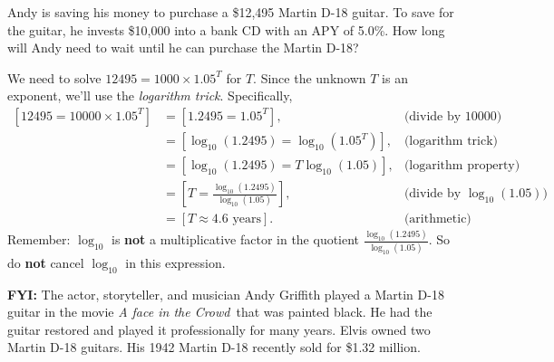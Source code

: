 \documentclass[12pt,fleqn,answers]{exam}
\begin{document}
\begin{questions} 

\question [2] Andy is saving his money to purchase a \$12,495 Martin D-18 guitar.
To save for the guitar, he invests \$10,000 into a bank CD with an APY of 5.0\%. 
How long will Andy need to wait until he can purchase the Martin D-18?

\begin{solution}[3.0in]
    We need to solve $12495 = 1000 \times 1.05^T$ for $T$. Since the unknown
    $T$ is an exponent, we'll use the \emph{logarithm trick}. Specifically,
    \begin{align*}
      \left[12495 = 10000 \times 1.05^T \right] &= \left[1.2495 = 1.05^T \right], &\mbox{(divide by 10000)} \\
                     &= \left[\log_{10}(1.2495) = \log_{10}(1.05^T) \right],  &\mbox{(logarithm trick)} \\
                     &= \left[\log_{10}(1.2495) = T \log_{10}(1.05) \right],  &\mbox{(logarithm property)} \\
                     &= \left[ T = \frac{\log_{10}(1.2495)}{\log_{10}(1.05)} \right],  &\mbox{(divide by $\log_{10}(1.05)$)} \\
                     &= \left[ T \approx 4.6 \mbox{ years} \right].  &\mbox{(arithmetic)}
    \end{align*}
Remember: $\log_{10}$ is \textbf{not} a multiplicative factor 
in the quotient $\displaystyle \frac{\log_{10}(1.2495)}{\log_{10}(1.05)}$. 
So do \textbf{not} cancel $\log_{10}$ in this expression.

\textbf{FYI:} The actor, storyteller, and musician Andy Griffith played a Martin D-18 guitar in the movie \emph{A face in the Crowd}\
that was painted black. He had the guitar restored and played it professionally
for many years. Elvis owned two Martin D-18 guitars. His 1942 Martin 
D-18 recently sold for \$1.32 million.
\end{solution}


\end{questions}
\end{document}
